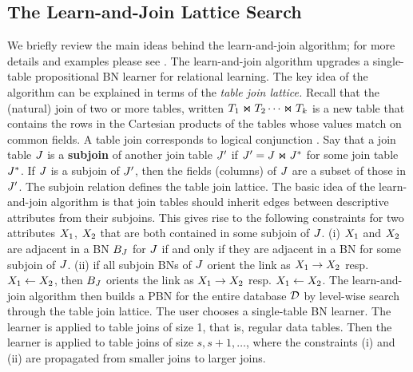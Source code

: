 \documentclass[runningheads,a4paper]{llncs}
\begin{document}
\subsection{The Learn-and-Join Lattice Search}
We briefly review the main ideas behind the learn-and-join algorithm; for more details and examples please see \cite{Schulte2012}. 
The learn-and-join algorithm upgrades a single-table propositional BN learner for relational learning. The key idea of the algorithm can be explained in terms of the {\em table join lattice.} Recall that the (natural) join of two or more tables, written $T_{1} \Join T_{2} \cdots \Join T_{k}$ is a new table that contains the rows in the Cartesian products of the tables whose values match on common fields. A table join corresponds to logical conjunction \cite{Ullman1982}.
Say that a join table $J$ is a \textbf{subjoin} of another join table $J'$
if $J' = J \Join J^{*}$ for some join table $J^{*}$. If $J$ is a subjoin of $J'$, then the fields (columns) of $J$ are a subset of those in $J'$. The subjoin relation defines the table join lattice. The basic idea of the learn-and-join algorithm is that join tables should inherit edges between descriptive attributes from their subjoins. This gives rise to the following constraints for two attributes $X_{1}$, $X_{2}$ that are both contained in some subjoin of $J$. (i) $X_{1}$ and $X_{2}$ are adjacent in a BN $B_{J}$ for $J$ if and only if they are adjacent in a BN for some subjoin of $J$. (ii) if all subjoin BNs of $J$ orient the link as $X_{1}\rightarrow X_{2}$ resp. $X_{1}\leftarrow X_{2}$, then $B_{J}$ orients the link as $X_{1}\rightarrow X_{2}$ resp. $X_{1}\leftarrow X_{2}$.
The learn-and-join algorithm then builds a PBN for the entire database $\mathcal{D}$ by level-wise search through the table join lattice. The user chooses a single-table BN learner. The learner is applied to table joins of size 1, that is, regular data tables. Then the learner is applied to table joins of size $s,s+1,\ldots$, where the constraints (i) and (ii) are propagated from smaller joins to larger joins.
\end{document}
